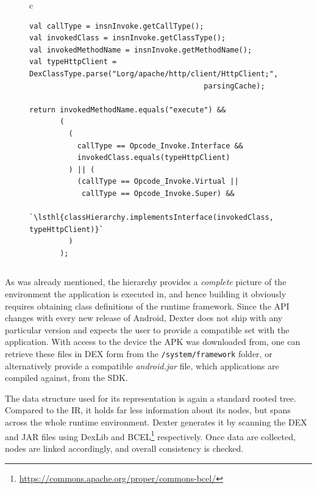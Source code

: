\documentclass[12pt,twoside,notitlepage]{report}
\newcommand{\highlight}[1]{\colorbox{lightOrange}{\strut #1}}
\newcommand{\lsthl}[1] {\ttfamily\scriptsize\highlight{#1}}
\newcommand{\weblink}[1] {\footnote{\scriptsize\url{#1}}}
\begin{document}
\begin{figure}[h]
	\centering
	\begin{tabular}{c}
	\begin{lstlisting}
val callType = insnInvoke.getCallType();
val invokedClass = insnInvoke.getClassType();
val invokedMethodName = insnInvoke.getMethodName();
val typeHttpClient = DexClassType.parse("Lorg/apache/http/client/HttpClient;", 
                                        parsingCache);

return invokedMethodName.equals("execute") &&
       (
         (
           callType == Opcode_Invoke.Interface && 
           invokedClass.equals(typeHttpClient)
         ) || (
           (callType == Opcode_Invoke.Virtual || 
           	callType == Opcode_Invoke.Super) && 
           `\lsthl{classHierarchy.implementsInterface(invokedClass, typeHttpClient)}`
         )
       );
	\end{lstlisting}
	\end{tabular}
	\begin{lstlisting}[caption={Code that decides whether a method call given by instruction in \texttt{insnInvoke} should be instrumented as an Apache HTTP Client sink.},
	                   label={listing:Sink_ApacheHTTPClient_CanBeApplied}]
	\end{lstlisting}
\end{figure}

As was already mentioned, the hierarchy provides a \emph{complete} picture of the environment the application is executed in, and hence building it obviously requires obtaining class definitions of the runtime framework. Since the API changes with every new release of Android, Dexter does not ship with any particular version and expects the user to provide a compatible set with the application. With access to the device the APK was downloaded from, one can retrieve these files in DEX form from the \verb$/system/framework$ folder, or alternatively provide a compatible \emph{android.jar} file, which applications are compiled against, from the SDK. 

The data structure used for its representation is again a standard rooted tree. Compared to the IR, it holds far less information about its nodes, but spans across the whole runtime environment. Dexter generates it by scanning the DEX and JAR files using DexLib and BCEL\weblink{https://commons.apache.org/proper/commons-bcel/} respectively. Once data are collected, nodes are linked accordingly, and overall consistency is checked.
\end{document}
